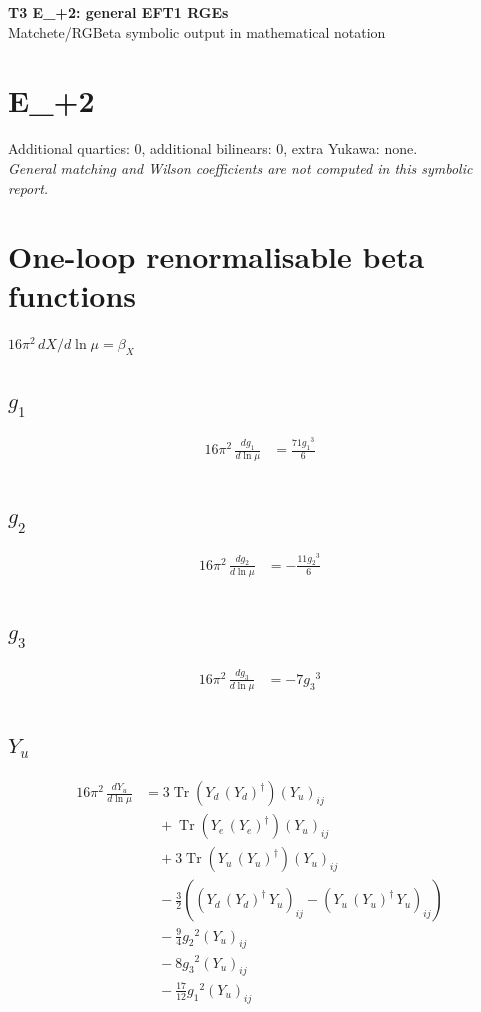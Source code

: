 \documentclass[10pt,a4paper]{article}
\begin{document}
\begin{center}
{\Large\bfseries T3 E\_+2: general EFT1 RGEs}\\[4pt]
Matchete/RGBeta symbolic output in mathematical notation
\end{center}
\bigskip
\section*{E\_+2}
Additional quartics: 0, additional bilinears: 0, extra Yukawa: none.\\
\emph{General matching and Wilson coefficients are not computed in this symbolic report.}
\clearpage
\section*{One-loop renormalisable beta functions}
$16\pi^2\,dX/d\ln\mu=\beta_X$
\subsection*{$g_1$}
\begin{align*}
16\pi^2\,\frac{d g_1}{d\ln\mu} &=\frac{71 {g_1}^3}{6} \\
\end{align*}
\subsection*{$g_2$}
\begin{align*}
16\pi^2\,\frac{d g_2}{d\ln\mu} &=-\frac{11 {g_2}^3}{6} \\
\end{align*}
\subsection*{$g_3$}
\begin{align*}
16\pi^2\,\frac{d g_3}{d\ln\mu} &=-7 {g_3}^3 \\
\end{align*}
\subsection*{$Y_u$}
\begin{align*}
16\pi^2\,\frac{d Y_u}{d\ln\mu} &=3 \operatorname{Tr}\!\left({Y_d}\,\left({Y_d}\right)^{\dagger}\right) \left({Y_u}\right)_{ij} \\
&\quad +\operatorname{Tr}\!\left({Y_e}\,\left({Y_e}\right)^{\dagger}\right) \left({Y_u}\right)_{ij} \\
&\quad +3 \operatorname{Tr}\!\left({Y_u}\,\left({Y_u}\right)^{\dagger}\right) \left({Y_u}\right)_{ij} \\
&\quad -\frac{3}{2} (\left({Y_d}\,\left({Y_d}\right)^{\dagger}\,{Y_u}\right)_{ij}-\left({Y_u}\,\left({Y_u}\right)^{\dagger}\,{Y_u}\right)_{ij}) \\
&\quad -\frac{9}{4} {g_2}^2 \left({Y_u}\right)_{ij} \\
&\quad -8 {g_3}^2 \left({Y_u}\right)_{ij} \\
&\quad -\frac{17}{12} {g_1}^2 \left({Y_u}\right)_{ij} \\
\end{align*}
\end{document}
